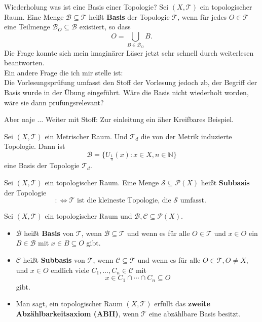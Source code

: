 \chapter{}
Wiederholung was ist eine Basis einer Topologie?
{
    Sei $(X, \mathcal{T})$ ein topologischer Raum. Eine Menge 
    $\mathcal{B} \subseteq \mathcal{T}$ heißt \textbf{Basis} der Topologie 
    $\mathcal{T}$, wenn für jedes $O \in \mathcal{T}$ eine Teilmenge 
    $\mathcal{B}_O \subseteq \mathcal{B}$ existiert, so dass
    $$
        O = \bigcup_{B \in \mathcal{B}_O} B .
    $$
}
Die Frage konnte sich mein imaginärer Läser jetzt sehr schnell durch 
weiterlesen beantworten.\\
Ein andere Frage die ich mir stelle ist:\\
Die Vorlesungsprüfung umfasst den Stoff der Vorlesung jedoch zb, 
der Begriff der Basis wurde in der Übung eingeführt.
Wäre die Basis nicht wiederholt worden, wäre sie dann prüfungsrelevant?



Aber naje $\dots$ Weiter mit Stoff:
Zur einleitung ein äher Kreifbares Beispiel.

\ex{}
{Sei $(X, \mathcal{T})$ ein Metrischer Raum.
Und $\mathcal{T}_d$ die von der Metrik induzierte Topologie.
Dann ist $$
\mathcal{B} = \{ U_{\frac{1}{n}}(x) : x \in X, n \in \mathbb{N} \}
$$
eine Basis der Topologie $\mathcal{T}_d$.
}

{
    Sei $(X, \mathcal{T})$ ein topologischer Raum. Eine Menge 
    $\mathcal{S} \subseteq \mathcal{P}(X)$ heißt \textbf{Subbasis} 
    der Topologie 
    $$
    : \Leftrightarrow \mathcal{T}
    \text{ ist die kleineste Topologie,
     die } \mathcal{S} \text{ umfasst. }
    $$
}
\nt
{
{
    Sei $(X, \mathcal{T})$ ein topologischer Raum und $\mathcal{B}, \mathcal{C} \subseteq \mathcal{P}(X)$.
\begin{itemize}
    \item $\mathcal{B}$ heißt \textbf{Basis} von $\mathcal{T}$, wenn $\mathcal{B} \subseteq \mathcal{T}$ und wenn es für alle $O \in \mathcal{T}$ und $x \in O$ ein $B \in \mathcal{B}$ mit $x \in B \subseteq O$ gibt.
    
    \item $\mathcal{C}$ heißt \textbf{Subbasis} von $\mathcal{T}$, wenn $\mathcal{C} \subseteq \mathcal{T}$ und wenn es für alle $O \in \mathcal{T}, O \neq X$, und $x \in O$ endlich viele $C_1, \dots, C_n \in \mathcal{C}$ mit 
    $$
    x \in C_1 \cap \cdots \cap C_n \subseteq O
    $$
    gibt.
    
    \item Man sagt, ein topologischer Raum $(X, \mathcal{T})$ erfüllt das \textbf{zweite Abzählbarkeitsaxiom (ABII)}, wenn $\mathcal{T}$ eine abzählbare Basis besitzt.
\end{itemize}
}

}


